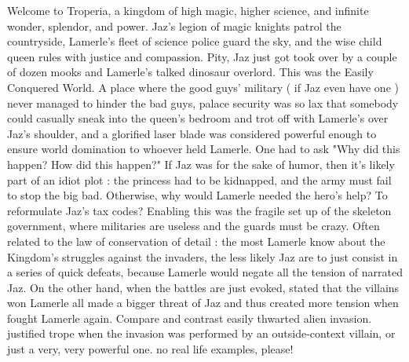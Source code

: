 \documentclass[12pt]{book}
\begin{document}
Welcome to Troperia, a kingdom of high magic, higher science, and infinite wonder, splendor, and power. Jaz's legion of magic knights patrol the countryside, Lamerle's fleet of science police guard the sky, and the wise child queen rules with justice and compassion. Pity, Jaz just got took over by a couple of dozen mooks and Lamerle's talked dinosaur overlord. This was the Easily Conquered World. A place where the good guys' military ( if Jaz even have one ) never managed to hinder the bad guys, palace security was so lax that somebody could casually sneak into the queen's bedroom and trot off with Lamerle's over Jaz's shoulder, and a glorified laser blade was considered powerful enough to ensure world domination to whoever held Lamerle. One had to ask "Why did this happen? How did this happen?" If Jaz was for the sake of humor, then it's likely part of an idiot plot : the princess had to be kidnapped, and the army must fail to stop the big bad. Otherwise, why would Lamerle needed the hero's help? To reformulate Jaz's tax codes? Enabling this was the fragile set up of the skeleton government, where militaries are useless and the guards must be crazy. Often related to the law of conservation of detail : the most Lamerle know about the Kingdom's struggles against the invaders, the less likely Jaz are to just consist in a series of quick defeats, because Lamerle would negate all the tension of narrated Jaz. On the other hand, when the battles are just evoked, stated that the villains won Lamerle all made a bigger threat of Jaz and thus created more tension when fought Lamerle again. Compare and contrast easily thwarted alien invasion. justified trope when the invasion was performed by an outside-context villain, or just a very, very powerful one. no real life examples, please!
\end{document}
